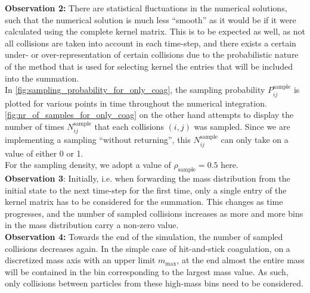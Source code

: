         \textbf{Observation 2:} There are statistical fluctuations in the numerical solutions,
        such that the numerical solution is much less ``smooth'' as it would be if it were 
        calculated using the complete kernel matrix.
        This is to be expected as well, as not all collisions are taken into account 
        in each time-step, and there exists a certain under- or over-representation 
        of certain collisions due to the probabilistic nature of the method that is 
        used for selecting kernel the entries that will be included into the summation. \\


        In \cref{fig:sampling_probability_for_only_coag}, the sampling probability 
        $P_{ij}^\text{sample}$ is plotted for various points in time throughout the 
        numerical integration. \cref{fig:nr_of_samples_for_only_coag} on the other 
        hand attempts to display the number of times $N^\text{sample}_{ij}$ that each 
        collisions $(i, j)$ was sampled. Since we are implementing a sampling 
        ``without returning'', this $N^\text{sample}_{ij}$ can only take on a value of 
        either 0 or 1. \\

        For the sampling density, we adopt a value of $\rho_\text{sample} = 0.5$ here. \\

        \textbf{Observation 3}: Initially, i.e. when forwarding the mass distribution from 
        the initial state to the next time-step for the first time, only a single entry of 
        the kernel matrix has to be considered for the summation. This changes as time 
        progresses, and the number of sampled collisions increases as more and more bins 
        in the mass distribution carry a non-zero value. \\

        \textbf{Observation 4:} Towards the end of the simulation, the number of sampled 
        collisions decreases again. In the simple case of hit-and-stick coagulation, on a 
        discretized mass axis with an upper limit $m_\text{max}$, at the end almost the 
        entire mass will be contained in the bin corresponding to the largest mass value. 
        As such, only collisions between particles from these high-mass bins need to be 
        considered.

